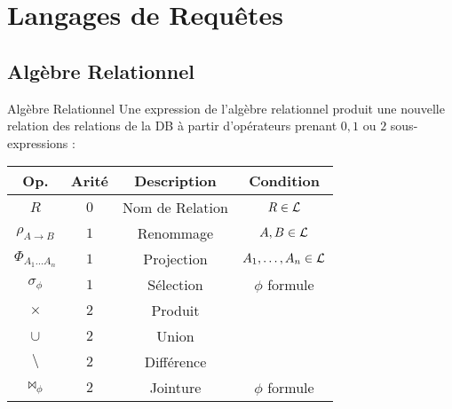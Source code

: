 \documentclass{cours}
\begin{document}
\section{Langages de Requêtes}
\subsection{Algèbre Relationnel}
\begin{définition}{Algèbre Relationnel}{}
    Une expression de l'algèbre relationnel produit une nouvelle relation des relations de la DB à partir d'opérateurs prenant $0, 1$ ou $2$ sous-expressions : 
    \begin{center}
        \begin{tabular}{cccc}
            \toprule
            Op. & Arité & Description & Condition\\
            \midrule
            $R$ & $0$ & Nom de Relation & $R\in \mathcal{L}$\\
            $\rho_{A \to B}$ & $1$ & Renommage & $A, B \in \mathcal{L}$\\
            $\Phi_{A_{1}\ldots A_{n}}$ & $1$ & Projection & $A_{1},\ldots, A_{n} \in \mathcal{L}$\\
            $\sigma_{\phi}$ & $1$ & Sélection & $\phi$ formule\\
            $\times$ & $2$ & Produit & \\
            $\cup$ & $2$ & Union & \\
            $\setminus$ & $2$ & Différence & \\
            $\bowtie_{\phi}$ & $2$ & Jointure & $\phi$ formule\\
            \bottomrule
        \end{tabular}
    \end{center}
\end{définition}
\end{document}

